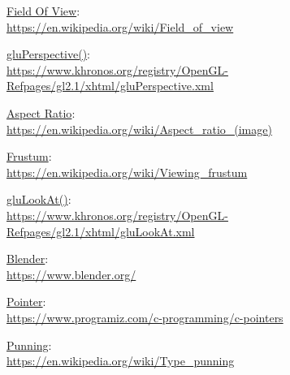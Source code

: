 \documentclass[12pt]{article}
\begin{document}



\begin{thebibliography}{9}

\underline{Field Of View}:\\
\url{https://en.wikipedia.org/wiki/Field_of_view}

\underline{gluPerspective()}:\\
\url{https://www.khronos.org/registry/OpenGL-Refpages/gl2.1/xhtml/gluPerspective.xml}

\underline{Aspect Ratio}:\\
\url{https://en.wikipedia.org/wiki/Aspect_ratio_(image)}

\underline{Frustum}:\\
\url{https://en.wikipedia.org/wiki/Viewing_frustum}

\underline{gluLookAt()}:\\
\url{https://www.khronos.org/registry/OpenGL-Refpages/gl2.1/xhtml/gluLookAt.xml}

\underline{Blender}:\\
\url{https://www.blender.org/}

\underline{Pointer}:\\
\url{https://www.programiz.com/c-programming/c-pointers}

\underline{Punning}:\\
\url{https://en.wikipedia.org/wiki/Type_punning}







\end{thebibliography}
\end{document}

